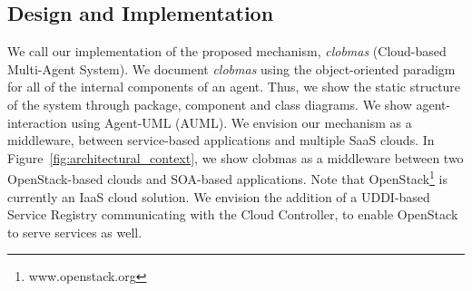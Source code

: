 \documentclass[10pt,journal,compsoc]{IEEEtran}
\begin{document}
%
% 


\subsection{Design and Implementation}
We call our implementation of the proposed mechanism, \textit{clobmas} (Cloud-based Multi-Agent System). We document \textit{clobmas} using the object-oriented paradigm for all of the internal components of an agent. Thus, we show the static structure of the system through package, component and class diagrams. We show agent-interaction using Agent-UML (AUML). We envision our mechanism as a middleware, between service-based applications and multiple SaaS clouds. In Figure~\ref{fig:architectural_context}, we show clobmas as a middleware between two OpenStack-based clouds and SOA-based applications. Note that OpenStack\footnote{www.openstack.org} is currently an IaaS cloud solution. We envision the addition of a UDDI-based Service Registry communicating with the Cloud Controller, to enable OpenStack to serve services as well. 
\end{document}

